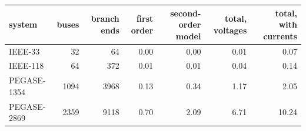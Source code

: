\begin{tabular}{lrrrrrr}
\toprule
system & buses & branch ends & first order & second-order model & total, voltages & total, with currents \\
\midrule
IEEE-33 & 32 & 64 & 0.00 & 0.00 & 0.01 & 0.07 \\
IEEE-118 & 64 & 372 & 0.01 & 0.01 & 0.04 & 0.14 \\
PEGASE-1354 & 1094 & 3968 & 0.13 & 0.34 & 1.17 & 2.05 \\
PEGASE-2869 & 2359 & 9118 & 0.70 & 2.09 & 6.71 & 10.24 \\
\bottomrule
\end{tabular}
